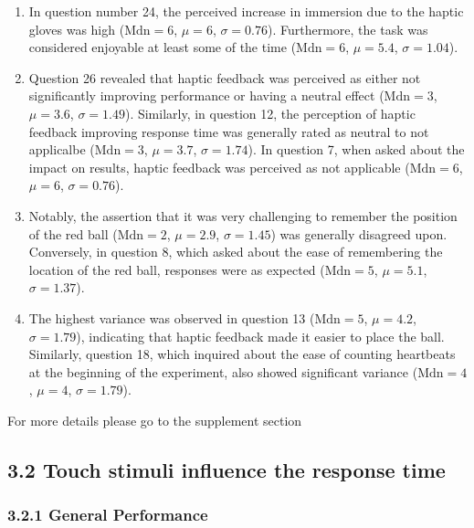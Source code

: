 \documentclass[12pt,oneside,openright]{report}
\begin{document}
    \begin{enumerate}
        \item In question number 24, the perceived increase in immersion due to the haptic gloves was high ($\text{Mdn} = 6$, $\mu = 6$, $\sigma = 0.76$). Furthermore, the task was considered enjoyable at least some of the time ($\text{Mdn} = 6$, $\mu = 5.4$, $\sigma = 1.04$).
        
        \item Question 26 revealed that haptic feedback was perceived as either not significantly improving performance or having a neutral effect ($\text{Mdn} = 3$, $\mu = 3.6$, $\sigma = 1.49$). Similarly, in question 12, the perception of haptic feedback improving response time was generally rated as neutral to not applicalbe ($\text{Mdn} = 3$, $\mu = 3.7$, $\sigma = 1.74$). In question 7, when asked about the impact on results, haptic feedback was perceived as not applicable ($\text{Mdn} = 6$, $\mu = 6$, $\sigma = 0.76$).
    
        \item Notably, the assertion that it was very challenging to remember the position of the red ball ($\text{Mdn} = 2$, $\mu = 2.9$, $\sigma = 1.45$) was generally disagreed upon. Conversely, in question 8, which asked about the ease of remembering the location of the red ball, responses were as expected ($\text{Mdn} = 5$, $\mu = 5.1$, $\sigma = 1.37$).
    
        \item The highest variance was observed in question 13 ($\text{Mdn} = 5$, $\mu = 4.2$, $\sigma = 1.79$), indicating that haptic feedback made it easier to place the ball. Similarly, question 18, which inquired about the ease of counting heartbeats at the beginning of the experiment, also showed significant variance ($\text{Mdn} = 4$, $\mu = 4$, $\sigma = 1.79$). 
        
    \end{enumerate}
    
    For more details please go to the supplement section 

    
\subsection*{3.2 Touch stimuli influence the response time}
\subsubsection*{3.2.1 General Performance}
\end{document}

